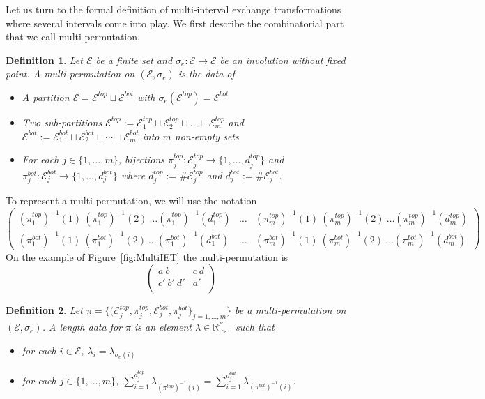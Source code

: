 \documentclass{article}
\def\RR{\mathbb{R}}
\def\cE{\mathcal{E}}
\newtheorem{definition}{Definition}
\begin{document}
Let us turn to the formal definition of multi-interval exchange transformations
where several intervals come into play. We first describe the combinatorial part
that we call multi-permutation.
\begin{definition}
Let $\cE$ be a finite set and $\sigma_e: \cE \to \cE$ be an involution without fixed point.
A \emph{multi-permutation} on $(\cE, \sigma_e)$ is the data of
\begin{itemize}
\item A partition $\cE = \cE^{top} \sqcup \cE^{bot}$ with $\sigma_e(\cE^{top}) = \cE^{bot}$
\item Two sub-partitions $\cE^{top} := \cE^{top}_1 \sqcup \cE^{top}_2 \sqcup \ldots \sqcup \cE^{top}_m$
and $\cE^{bot} := \cE^{bot}_1 \sqcup \cE^{bot}_2 \sqcup \cdots \sqcup \cE^{bot}_m$ into
$m$ non-empty sets
\item For each $j \in \{1, \ldots, m\}$, bijections $\pi^{top}_j: \cE^{top}_j \to \{1, \ldots, d_j^{top}\}$
and $\pi^{bot}_j: \cE^{bot}_j \to \{1, \ldots, d_j^{bot}\}$ where
$d_j^{top} := \# \cE^{top}_j$ and $d_j^{bot} := \# \cE^{bot}_j$.
\end{itemize}
\end{definition}

To represent a multi-permutation, we will use the notation
\[
\left(\begin{array}{c|c|c}
(\pi_1^{top})^{-1}(1)\ (\pi_1^{top})^{-1}(2)\ \ldots (\pi_1^{top})^{-1}(d_1^{top}) &
\ldots &
(\pi_m^{top})^{-1}(1)\ (\pi_m^{top})^{-1}(2)\ \ldots (\pi_m^{top})^{-1}(d_m^{top})
\\
(\pi_1^{bot})^{-1}(1)\ (\pi_1^{bot})^{-1}(2)\ \ldots (\pi_1^{bot})^{-1}(d_1^{bot}) &
\ldots &
(\pi_m^{bot})^{-1}(1)\ (\pi_m^{bot})^{-1}(2)\ \ldots (\pi_m^{bot})^{-1}(d_m^{bot})
\end{array}\right)
\]
On the example of Figure~\ref{fig:MultiIET} the multi-permutation is
\[
\left(\begin{array}{c|c}
a\ b & c\ d \\
c'\ b'\ d' & a' \\
\end{array} \right)
\]

\begin{definition}
Let $\pi = \{(\cE^{top}_j, \pi^{top}_j, \cE^{bot}_j, \pi^{bot}_j\}_{j=1,\ldots,m}\}$ be
a multi-permutation on $(\cE, \sigma_e)$. A \emph{length data} for $\pi$ is
an element $\lambda \in \RR_{> 0}^{\cE}$ such that
\begin{itemize}
\item for each $i \in \cE$, $\lambda_i = \lambda_{\sigma_e(i)}$
\item for each $j \in \{1,\ldots,m\}$, $\displaystyle \sum_{i = 1}^{d_j^{top}} \lambda_{(\pi^{top})^{-1}(i)} = \sum_{i = 1}^{d_j^{bot}} \lambda_{(\pi^{bot})^{-1}(i)}$.
\end{itemize}
\end{definition}
\end{document}
